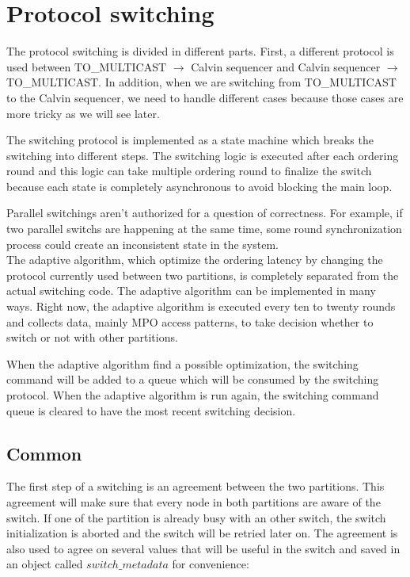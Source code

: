 \documentclass[a4paper, 10pt]{article}
\newcommand{\Li}[1]{\mynote{Li}{#1}{blue}}
\begin{document}
\section{Protocol switching}

The protocol switching is divided in different parts. First, a different protocol is used between
TO\_MULTICAST $\rightarrow$ Calvin sequencer and Calvin sequencer $\rightarrow$ TO\_MULTICAST.
In addition, when we are switching from TO\_MULTICAST to the Calvin sequencer, we need to handle different
cases because those cases are more tricky as we will see later.

The switching protocol is implemented as a state machine which
breaks the switching into different steps. The switching logic is executed after each ordering round and
this logic can take multiple ordering round to finalize the switch because each state is completely asynchronous
to avoid blocking the main loop.

Parallel switchings aren't authorized for a question of correctness. For example, if two parallel switchs are happening
at the same time, some round synchronization process could create an inconsistent state in the system. \\

The adaptive algorithm, which optimize the ordering latency by changing the protocol currently used between
two partitions, is completely separated from the actual switching code. The adaptive algorithm can be
implemented in many ways. Right now, the adaptive algorithm is executed every ten to twenty
rounds and collects data, mainly MPO access patterns, to take decision whether to switch or not with
other partitions.

When the adaptive algorithm find a possible optimization, the switching command will be added to a queue which will be
consumed by the switching protocol. When the adaptive algorithm is run again, the switching command queue
is cleared to have the most recent switching decision.


\subsection{Common}

The first step of a switching is an agreement between the two partitions. This agreement will make sure that
every node in both partitions are aware of the switch. If one of the partition is already busy with an other
switch, the switch initialization is aborted and the switch will be retried later on.
The agreement is also used to agree on several values that will be useful in the switch and saved in an object called $switch\_metadata$ for
convenience:
\end{document}

